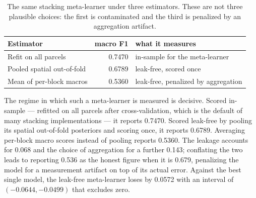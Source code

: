 \begin{table}[tbp]
\caption{The same stacking meta-learner under three estimators. These are not three plausible
choices: the first is contaminated and the third is penalized by an aggregation artifact.}
\label{tab:regimes}
\centering
\begin{tabular}{lrl}
\toprule
Estimator & macro F1 & what it measures \\
\midrule
Refit on all parcels & 0.7470 & in-sample for the meta-learner \\
Pooled spatial out-of-fold & 0.6789 & leak-free, scored once \\
Mean of per-block macros & 0.5360 & leak-free, penalized by aggregation \\
\bottomrule
\end{tabular}
\end{table}

The regime in which such a meta-learner is measured is decisive. Scored in-sample --- refitted on
all parcels after cross-validation, which is the default of many stacking implementations --- it
reports \num{0.7470}. Scored leak-free by pooling its spatial out-of-fold posteriors and scoring
once, it reports \num{0.6789}. Averaging per-block macro scores instead of pooling reports
\num{0.5360}. The leakage accounts for \num{0.068} and the choice of aggregation for a further
\num{0.143}; conflating the two leads to reporting \num{0.536} as the honest figure when it is
\num{0.679}, penalizing the model for a measurement artifact on top of its actual error. Against
the best single model, the leak-free meta-learner loses by \num{0.0572} with an interval of
$(-0.0644, -0.0499)$ that excludes zero.
